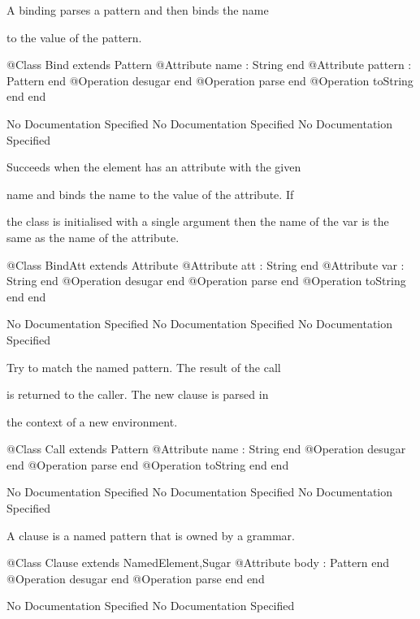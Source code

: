       A binding parses a pattern and then binds the name

      to the value of the pattern.
\begin{Interface}
@Class Bind extends Pattern
  @Attribute name : String end
  @Attribute pattern : Pattern end
  @Operation desugar end
  @Operation parse end
  @Operation toString end
end
\end{Interface}
No Documentation Specified
No Documentation Specified
No Documentation Specified

      Succeeds when the element has an attribute with the given

      name and binds the name to the value of the attribute. If

      the class is initialised with a single argument then the 
      name of the var is the same as the name of the attribute.
\begin{Interface}
@Class BindAtt extends Attribute
  @Attribute att : String end
  @Attribute var : String end
  @Operation desugar end
  @Operation parse end
  @Operation toString end
end
\end{Interface}
No Documentation Specified
No Documentation Specified
No Documentation Specified

      Try to match the named pattern. The result of the call

      is returned to the caller. The new clause is parsed in

      the context of a new environment.
\begin{Interface}
@Class Call extends Pattern
  @Attribute name : String end
  @Operation desugar end
  @Operation parse end
  @Operation toString end
end
\end{Interface}
No Documentation Specified
No Documentation Specified
No Documentation Specified

      A clause is a named pattern that is owned by a grammar.
\begin{Interface}
@Class Clause extends NamedElement,Sugar
  @Attribute body : Pattern end
  @Operation desugar end
  @Operation parse end
end
\end{Interface}
No Documentation Specified
No Documentation Specified

